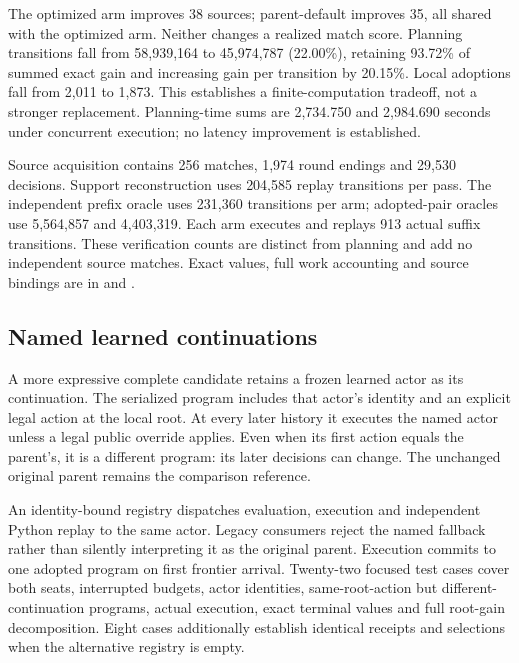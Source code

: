 \begin{table}[ht]
\centering\small

\caption{Fresh-source expected gains over the parent and paired proposal
contrasts, in percentage points. Within-population bootstrap uses 20,000
replicates and nominal simultaneous lower bounds for the two parents.}
\label{tab:prospective-proposals}
\end{table}

The optimized arm improves 38 sources; parent-default improves 35, all shared
with the optimized arm. Neither changes a realized match score. Planning
transitions fall from 58,939,164 to 45,974,787 (22.00\%), retaining 93.72\% of
summed exact gain and increasing gain per transition by 20.15\%. Local
adoptions fall from 2,011 to 1,873. This establishes a finite-computation
tradeoff, not a stronger replacement. Planning-time sums are 2,734.750 and
2,984.690 seconds under concurrent execution; no latency improvement is
established.

Source acquisition contains 256 matches, 1,974 round endings and 29,530
decisions. Support reconstruction uses 204,585 replay transitions per pass.
The independent prefix oracle uses 231,360 transitions per arm; adopted-pair
oracles use 5,564,857 and 4,403,319. Each arm executes and replays 913 actual
suffix transitions. These verification counts are distinct from planning
and add no independent source matches. Exact values, full work accounting
and source bindings are in 
and .

\subsection{Named learned continuations}
A more expressive complete candidate retains a frozen learned actor as its
continuation. The serialized program includes that actor's identity and an
explicit legal action at the local root. At every later history it executes
the named actor unless a legal public override applies. Even when its first
action equals the parent's, it is a different program: its later decisions
can change. The unchanged original parent remains the comparison reference.

An identity-bound registry dispatches evaluation, execution and independent
Python replay to the same actor. Legacy consumers reject the named fallback
rather than silently interpreting it as the original parent. Execution commits
to one adopted program on first frontier arrival. Twenty-two focused test
cases cover both seats, interrupted budgets, actor identities, same-root-action
but different-continuation programs, actual execution, exact terminal values
and full root-gain decomposition. Eight cases additionally establish identical
receipts and selections when the alternative registry is empty.

